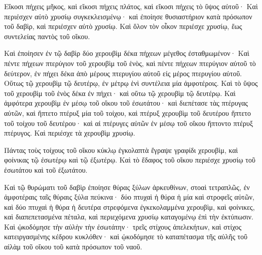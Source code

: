 {Εἴκοσι πήχεις μῆκος, καὶ εἴκοσι πήχεις πλάτος, καὶ εἴκοσι πήχεις τὸ ὕψος αὐτοῦ· Καὶ περιέσχεν αὐτὸ χρυσίῳ συγκεκλεισμένῳ· καὶ ἐποίησε θυσιαστήριον
κατὰ πρόσωπον τοῦ δαβὶρ, καὶ περιέσχεν αὐτὸ χρυσίῳ.
Καὶ ὅλον τὸν οἶκον περιέσχε χρυσίῳ, ἕως συντελείας παντὸς τοῦ οἴκου.
\par }{\PP {}Καὶ ἐποίησεν ἐν τῷ δαβὶρ δύο χερουβὶμ δέκα πήχεων μέγεθος ἐσταθμωμένον·
Καὶ πέντε πήχεων πτερύγιον τοῦ χερουβὶμ τοῦ ἑνὸς, καὶ πέντε πήχεων πτερύγιον αὐτοῦ τὸ δεύτερον, ἐν πήχει δέκα ἀπὸ μέρους πτερυγίου αὐτοῦ εἰς μέρος πτερυγίου αὐτοῦ.
Οὕτως τῷ χερουβὶμ τῷ δευτέρῳ, ἐν μέτρῳ ἑνὶ συντέλεια μία ἀμφοτέροις.
Καὶ τὸ ὕψος τοῦ χερουβὶμ τοῦ ἑνὸς δέκα ἐν πήχει· καὶ οὕτω τῷ χερουβὶμ τῷ δευτέρῳ.
Καὶ ἀμφότερα χερουβὶμ ἐν μέσῳ τοῦ οἴκου τοῦ ἐσωτάτου· καὶ διεπέτασε τὰς πτέρυγας αὐτῶν, καὶ ἥπτετο πτέρυξ μία τοῦ τοίχου, καὶ πτέρυξ χερουβὶμ τοῦ δευτέρου ἥπτετο τοῦ τοίχου τοῦ δευτέρου· καὶ αἱ πτέρυγες αὐτῶν ἐν μέσῳ τοῦ οἴκου ἥπτοντο πτέρυξ πτέρυγος.
Καὶ περιέσχε τὰ χερουβὶμ χρυσίῳ.
\par }{\PP {}Πάντας τοὺς τοίχους τοῦ οἴκου κύκλῳ ἐγκολαπτὰ ἔγραψε γραφίδι χερουβὶμ, καὶ φοίνικας τῷ ἐσωτέρῳ καὶ τῷ ἐξωτέρῳ.
Καὶ τὸ ἔδαφος τοῦ οἴκου περιέσχε χρυσίῳ τοῦ ἐσωτάτου καὶ τοῦ ἐξωτάτου.
\par }{\PP {}Καὶ τῷ θυρώματι τοῦ δαβὶρ ἐποίησε θύρας ξύλων ἀρκευθίνων, στοαὶ τετραπλῶς,
ἐν ἀμφοτέραις ταῖς θύραις ξύλα πεύκινα· δύο πτυχαὶ ἡ θύρα ἡ μία καὶ στροφεῖς αὐτῶν, καὶ δύο πτυχαὶ ἡ θύρα ἡ δευτέρα στρεφόμενα ἐγκεκολαμμένα χερουβὶμ,
καὶ φοίνικες, καὶ διαπεπετασμένα πέταλα, καὶ περιεχόμενα χρυσίῳ καταγομένῳ ἐπὶ τὴν ἐκτύπωσιν.
Καὶ ᾠκοδόμησε τὴν αὐλὴν τὴν ἐσωτάτην· τρεῖς στίχους ἀπελεκήτων, καὶ στίχος κατειργασμένης κέδρου κυκλόθεν·
καὶ ᾠκοδόμησε τὸ καταπέτασμα τῆς αὐλῆς τοῦ αἰλὰμ τοῦ οἴκου τοῦ κατὰ πρόσωπον τοῦ ναοῦ.

}

